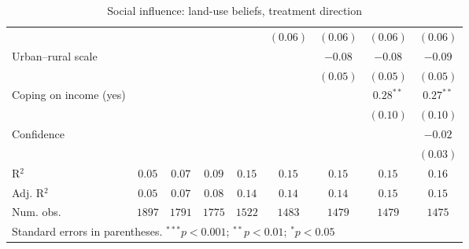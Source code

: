 \begin{table}[h]
\begin{center}
\begin{tabular}{l c c c c c c c c}
                                                                                &              &               &               &               & $(0.06)$      & $(0.06)$      & $(0.06)$      & $(0.06)$      \\
Urban–rural scale                                                               &              &               &               &               &               & $-0.08$       & $-0.08$       & $-0.09$       \\
                                                                                &              &               &               &               &               & $(0.05)$      & $(0.05)$      & $(0.05)$      \\
Coping on income (yes)                                                          &              &               &               &               &               &               & $0.28^{**}$   & $0.27^{**}$   \\
                                                                                &              &               &               &               &               &               & $(0.10)$      & $(0.10)$      \\
Confidence                                                                      &              &               &               &               &               &               &               & $-0.02$       \\
                                                                                &              &               &               &               &               &               &               & $(0.03)$      \\
\hline
R$^2$                                                                           & $0.05$       & $0.07$        & $0.09$        & $0.15$        & $0.15$        & $0.15$        & $0.15$        & $0.16$        \\
Adj. R$^2$                                                                      & $0.05$       & $0.07$        & $0.08$        & $0.14$        & $0.14$        & $0.14$        & $0.15$        & $0.15$        \\
Num. obs.                                                                       & $1897$       & $1791$        & $1775$        & $1522$        & $1483$        & $1479$        & $1479$        & $1475$        \\
\hline
\multicolumn{9}{l}{\scriptsize{Standard errors in parentheses. $^{***}p<0.001$; $^{**}p<0.01$; $^{*}p<0.05$}}
\end{tabular}
\caption{Social influence: land-use beliefs, treatment direction}
\label{table:social_influence_landemi_treatment_direction}
\end{center}
\end{table}
